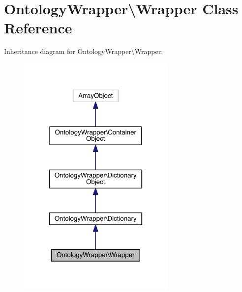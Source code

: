 \hypertarget{class_ontology_wrapper_1_1_wrapper}{\section{Ontology\-Wrapper\textbackslash{}Wrapper Class Reference}
\label{class_ontology_wrapper_1_1_wrapper}
}


Inheritance diagram for Ontology\-Wrapper\textbackslash{}Wrapper\-:
\nopagebreak
\begin{figure}[H]
\begin{center}
\leavevmode
\includegraphics[width=220pt]{class_ontology_wrapper_1_1_wrapper__inherit__graph}
\end{center}
\end{figure}


